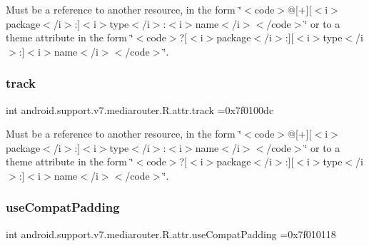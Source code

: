 Must be a reference to another resource, in the form \char`\"{}$<$code$>$@\mbox{[}+\mbox{]}\mbox{[}$<$i$>$package$<$/i$>$\+:\mbox{]}$<$i$>$type$<$/i$>$\+:$<$i$>$name$<$/i$>$$<$/code$>$\char`\"{} or to a theme attribute in the form \char`\"{}$<$code$>$?\mbox{[}$<$i$>$package$<$/i$>$\+:\mbox{]}\mbox{[}$<$i$>$type$<$/i$>$\+:\mbox{]}$<$i$>$name$<$/i$>$$<$/code$>$\char`\"{}. \mbox{\label{classandroid_1_1support_1_1v7_1_1mediarouter_1_1R_1_1attr_a13264085643a0ef36c13712084481c13}} 
\subsubsection{\texorpdfstring{track}{track}}
{\footnotesize\ttfamily int android.\+support.\+v7.\+mediarouter.\+R.\+attr.\+track =0x7f0100dc\hspace{0.3cm}{\ttfamily [static]}}

Must be a reference to another resource, in the form \char`\"{}$<$code$>$@\mbox{[}+\mbox{]}\mbox{[}$<$i$>$package$<$/i$>$\+:\mbox{]}$<$i$>$type$<$/i$>$\+:$<$i$>$name$<$/i$>$$<$/code$>$\char`\"{} or to a theme attribute in the form \char`\"{}$<$code$>$?\mbox{[}$<$i$>$package$<$/i$>$\+:\mbox{]}\mbox{[}$<$i$>$type$<$/i$>$\+:\mbox{]}$<$i$>$name$<$/i$>$$<$/code$>$\char`\"{}. \mbox{\label{classandroid_1_1support_1_1v7_1_1mediarouter_1_1R_1_1attr_a5a5595096c2291118e9efc9446b81f89}} 
\subsubsection{\texorpdfstring{use\+Compat\+Padding}{useCompatPadding}}
{\footnotesize\ttfamily int android.\+support.\+v7.\+mediarouter.\+R.\+attr.\+use\+Compat\+Padding =0x7f010118\hspace{0.3cm}{\ttfamily [static]}}

